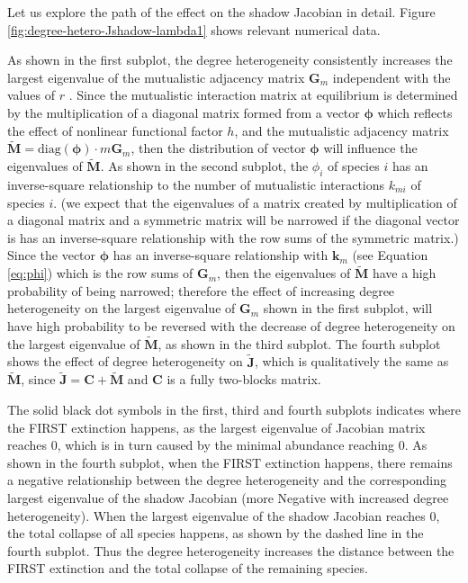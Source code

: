 \documentclass[a4paper,fleqn,12pt]{article}
\begin{document}
Let us explore the path of the effect on the shadow Jacobian in detail.
Figure \ref{fig:degree-hetero-Jshadow-lambda1} shows relevant numerical data.

As shown in the first subplot, the degree heterogeneity consistently increases the largest eigenvalue of the mutualistic adjacency matrix $\mathbf{G}_m$ independent with the values of $r$ \cite{allesina_stability_2012}.
Since the mutualistic interaction matrix at equilibrium is determined by the multiplication of a diagonal matrix formed from a vector $\boldsymbol{\phi}$ which reflects the effect of nonlinear functional factor $h$, and the mutualistic adjacency matrix $\widetilde{\mathbf{M}} = \mathrm{diag}(\boldsymbol{\phi}) \cdot m\mathbf{G}_m$,
then the distribution of vector $\boldsymbol{\phi}$ will influence the eigenvalues of $\widetilde{\mathbf{M}}$.
As shown in the second subplot, 
the $\phi_i$ of species $i$ has an inverse-square relationship to the number of mutualistic interactions $k_{mi}$ of species $i$.
(we expect that the eigenvalues of a matrix created by multiplication of a diagonal matrix and a symmetric matrix will be narrowed if the diagonal vector is {\color{red}has an inverse-square relationship} with the row sums of the symmetric matrix.)
Since the vector $\boldsymbol{\phi}$ has an inverse-square relationship with $\mathbf{k}_m$ (see Equation \ref{eq:phi}) which is the row sums of $\mathbf{G}_m$,
then the eigenvalues of $\widetilde{\mathbf{M}}$ have a high probability of being narrowed; therefore the effect of increasing degree heterogeneity on the largest eigenvalue of $\mathbf{G}_m$ shown in the first subplot,
will have high probability to be reversed with the decrease of degree heterogeneity on the largest eigenvalue of $\widetilde{\mathbf{M}}$, as shown in the third subplot.
The fourth subplot shows the effect of degree heterogeneity on $\widetilde{\mathbf{J}}$, which is qualitatively the same as $\widetilde{\mathbf{M}}$, since $\widetilde{\mathbf{J}} = \mathbf{C} + \widetilde{\mathbf{M}}$ and $\mathbf{C}$ is a fully two-blocks matrix.

The solid black dot symbols in the first, third and fourth subplots indicates where the FIRST extinction happens, as the largest eigenvalue of Jacobian matrix reaches 0, which is in turn caused by the minimal abundance reaching 0.
As shown in the fourth subplot, when the FIRST extinction happens, there remains a negative relationship between the degree heterogeneity and the corresponding largest eigenvalue of the shadow Jacobian (more Negative with increased degree heterogeneity). When the largest eigenvalue of the shadow Jacobian reaches 0, the total collapse of all species happens, as shown by the dashed line in the fourth subplot. 
Thus the degree heterogeneity increases the distance between the FIRST extinction and the total collapse of the remaining species.
\end{document}
